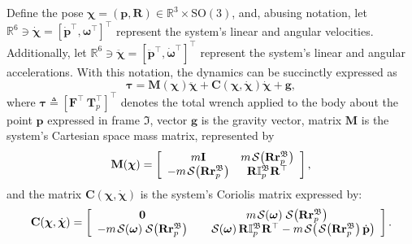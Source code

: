 Define the pose $\boldsymbol{\chi} = (\mathbf{p}, \mathbf{R}) \in \mathbb{R}^3\times \text{SO}(3)$, and, abusing notation, let $\mathbb{R}^6\ni\dot{\boldsymbol{\chi}} = \left[\dot{\mathbf{p}}^\top, \boldsymbol{\omega}^\top \right]^\top$ represent the system's linear and angular velocities. Additionally, let $\mathbb{R}^6\ni\ddot{\boldsymbol{\chi}} = \left[\ddot{\mathbf{p}}^\top, \dot{\boldsymbol{\omega}}^\top \right]^\top$ represent the system's linear and angular accelerations.
With this notation, the dynamics can be succinctly expressed as
\begin{equation}
    \boldsymbol{\tau } = \mathbf {M}(\boldsymbol{\chi})\ddot{\boldsymbol{\chi}} + \mathbf {C}(\boldsymbol{\chi},\dot{\boldsymbol{\chi}})\dot{\boldsymbol{\chi}} + \mathbf{g},\label{eq:tau}
\end{equation}
where $\boldsymbol{\tau}\triangleq[\mathbf{F}^\top\ \mathbf{T}_p^\top]^\top$ denotes the total wrench applied to the body about the point $\mathbf{p}$ expressed in frame $\mathfrak{I}$, vector $\mathbf{g}$ is the gravity vector, matrix $\mathbf{M}$ is the system's Cartesian space mass matrix, represented by
\begin{equation}
    \mathbf {M}(\boldsymbol{\chi}) = \left[\begin{array}{cc}m\mathbf {I} & m\SL[\mathbf {R} \mathbf {r}_p^\mathfrak{B}] \\ -m\SL[\mathbf {R} \mathbf {r}_p^\mathfrak{B}] & \mathbf {R} \mathbb{I}^\mathfrak{B}_p \mathbf {R}^\top \end{array} \right],\label{eq:Mcartesian}
\end{equation}
and the matrix $\mathbf {C}(\boldsymbol{\chi},\dot{\boldsymbol{\chi}})$ is the system's Coriolis matrix expressed by:
\begin{equation}
    \mathbf {C}(\boldsymbol{\chi},\dot{\boldsymbol{\chi}}) = \left[\begin{array}{cc}\boldsymbol{0}& m\SL[\boldsymbol{\omega }] \SL[\mathbf {R} \mathbf {r}_p^\mathfrak{B}] \\ -m\SL[\boldsymbol{\omega }]\SL[\mathbf {R} \mathbf {r}_p^\mathfrak{B}] & \quad\SL[\boldsymbol{\omega }] \mathbf {R}\mathbb{I}_p^\mathfrak{B}\mathbf {R}^\top 
    -m\SL[\SL[\mathbf {R}\mathbf {r}_p^\mathfrak{B}] \dot{\mathbf{p}}] \end{array} \right]. \label{eq:C}
\end{equation}


